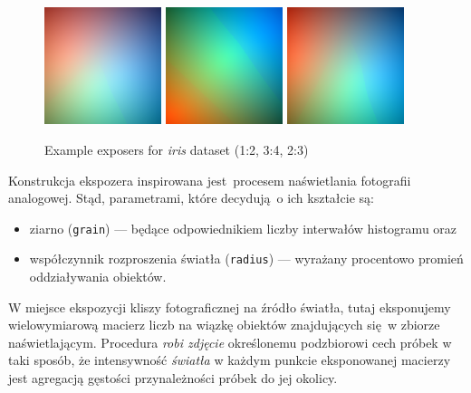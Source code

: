 \documentclass[]{article}
\begin{document}
\begin{figure}[hbt]
	\centering
	\includegraphics[width=0.305\textwidth]{figures/exponer_iris_1_2}
	\includegraphics[width=0.305\textwidth]{figures/exponer_iris_4_3}
	\includegraphics[width=0.305\textwidth]{figures/exponer_iris_3_2}
  	\caption{Example exposers for \emph{iris} dataset (1:2, 3:4, 2:3)}
  	\label{fig:exp1}
\end{figure}

Konstrukcja ekspozera inspirowana jest procesem naświetlania fotografii analogowej. Stąd, parametrami, które decydują o ich kształcie są:

\begin{itemize}
	\item ziarno (\verb|grain|) --- będące odpowiednikiem liczby interwałów histogramu oraz
	\item współczynnik rozproszenia światła (\verb|radius|) --- wyrażany procentowo promień oddziaływania obiektów. 
\end{itemize}

W miejsce ekspozycji kliszy fotograficznej na źródło światła, tutaj eksponujemy wielowymiarową macierz liczb na wiązkę obiektów znajdujących się w zbiorze naświetlającym. Procedura \emph{robi zdjęcie} określonemu podzbiorowi cech próbek w taki sposób, że intensywność \emph{światła} w każdym punkcie eksponowanej macierzy jest agregacją gęstości przynależności próbek do jej okolicy.
\end{document}
